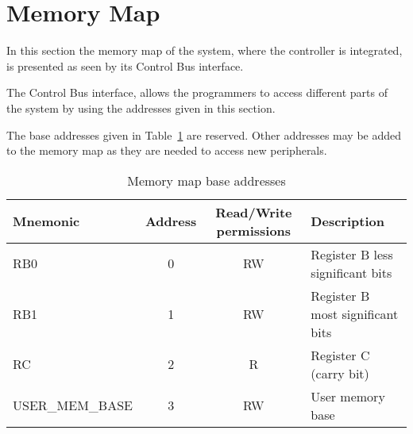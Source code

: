 \section{Memory Map}
\label{sec:mem_map}

In this section the memory map of the system, where the controller is
integrated, is presented as seen by its Control Bus interface.

The Control Bus interface, allows the programmers to access different parts
of the system by using the addresses given in this section.

The base addresses given in Table~\ref{tab:memmap} are reserved. Other
addresses may be added to the memory map as they are needed to access
new peripherals.

\begin{table}[!htbp]
  \centering
    \begin{tabular}{|p{3cm}|c|c|p{5cm}|}
    \hline 
    {\bf Mnemonic} & {\bf Address} & {\bf Read/Write permissions} & {\bf Description} \\
    \hline \hline 
     RB0 & 0 & RW & Register B less significant bits \\
    \hline
     RB1 & 1 & RW & Register B most significant bits \\
    \hline
     RC  & 2 & R & Register C (carry bit) \\
    \hline
     USER\_MEM\_BASE & 3 & RW &  User memory base\\
    \hline
 
    \end{tabular}
  \caption{Memory map base addresses}
  \label{tab:memmap}
\end{table}


